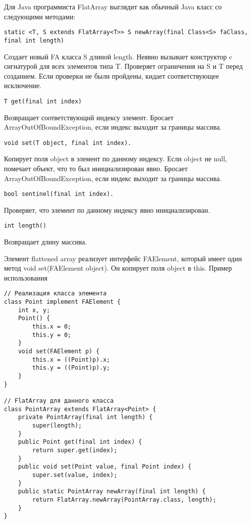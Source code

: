 Для Java программиста FlatArray выглядит как обычный Java класс со следующими методами:
\begin{lstlisting}
static <T, S extends FlatArray<T>> S newArray(final Class<S> faClass, final int length)
\end{lstlisting}
Создает новый FA класса S длиной length. Неявно вызывает конструктор c сигнатурой для всех элементов типа T. Проверяет ограничения на S и T перед созданием. Если проверки не были пройдены, кидает соответствующее исключение.
\begin{lstlisting}
T get(final int index)
\end{lstlisting}
Возвращает соответствующий индексу элемент. Бросает ArrayOutOfBoundException, если индекс выходит за границы массива.
\begin{lstlisting}
void set(T object, final int index).
\end{lstlisting}
Копирует поля object в элемент по данному индексу. Если object не null, помечает объект, что то был инициализирован явно. Бросает ArrayOutOfBoundException, если индекс выходит за границы массива.
\begin{lstlisting}
bool sentinel(final int index).
\end{lstlisting}
Проверяет, что элемент по данному индексу явно инициализирован.
\begin{lstlisting}
int length()
\end{lstlisting}
Возвращает длину массива. 
\par
Элемент flattened array реализует интерфейс FAElement, который имеет один метод void set(FAElement object). Он копирует поля object в this. 
Пример использования
\begin{lstlisting}
// Реализация класса элемента
class Point implement FAElement {
	int x, y;
	Point() {
		this.x = 0; 
		this.y = 0; 
	}
	void set(FAElement p) { 
		this.x = ((Point)p).x; 
		this.y = ((Point)p).y; 
	}
}

// FlatArray для данного класса
class PointArray extends FlatArray<Point> {
	private PointArray(final int length) { 
		super(length); 
	}
	public Point get(final int index) { 
		return super.get(index); 
	}
	public void set(Point value, final Point index) { 
		super.set(value, index); 
	}
	public static PointArray newArray(final int length) { 
		return FlatArray.newArray(PointArray.class, length); 
	}
}
\end{lstlisting}

